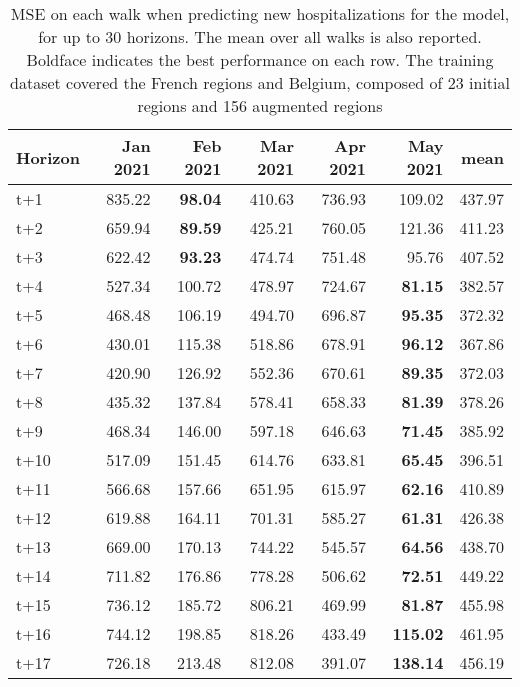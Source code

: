 \begin{table}[H]
\centering
\caption{MSE on each walk when predicting new hospitalizations for the model, for up to 30 horizons. The mean over all walks is also reported. Boldface indicates the best performance on each row. The training dataset covered the French regions and Belgium, composed of 23 initial regions and 156 augmented regions }
\label{tab:MSE_walk_encoder_decoder}
\begin{tabular}{lrrrrrr}
\toprule
Horizon &  Jan 2021 &  Feb 2021 &  Mar 2021 &  Apr 2021 &  May 2021 &   mean \\
\midrule
t+1  & 835.22  & \textbf{98.04}  & 410.63  & 736.93  & 109.02  & 437.97  \\
t+2  & 659.94  & \textbf{89.59}  & 425.21  & 760.05  & 121.36  & 411.23  \\
t+3  & 622.42  & \textbf{93.23}  & 474.74  & 751.48  & 95.76  & 407.52  \\
t+4  & 527.34  & 100.72  & 478.97  & 724.67  & \textbf{81.15}  & 382.57  \\
t+5  & 468.48  & 106.19  & 494.70  & 696.87  & \textbf{95.35}  & 372.32  \\
t+6  & 430.01  & 115.38  & 518.86  & 678.91  & \textbf{96.12}  & 367.86  \\
t+7  & 420.90  & 126.92  & 552.36  & 670.61  & \textbf{89.35}  & 372.03  \\
t+8  & 435.32  & 137.84  & 578.41  & 658.33  & \textbf{81.39}  & 378.26  \\
t+9  & 468.34  & 146.00  & 597.18  & 646.63  & \textbf{71.45}  & 385.92  \\
t+10  & 517.09  & 151.45  & 614.76  & 633.81  & \textbf{65.45}  & 396.51  \\
t+11  & 566.68  & 157.66  & 651.95  & 615.97  & \textbf{62.16}  & 410.89  \\
t+12  & 619.88  & 164.11  & 701.31  & 585.27  & \textbf{61.31}  & 426.38  \\
t+13  & 669.00  & 170.13  & 744.22  & 545.57  & \textbf{64.56}  & 438.70  \\
t+14  & 711.82  & 176.86  & 778.28  & 506.62  & \textbf{72.51}  & 449.22  \\
t+15  & 736.12  & 185.72  & 806.21  & 469.99  & \textbf{81.87}  & 455.98  \\
t+16  & 744.12  & 198.85  & 818.26  & 433.49  & \textbf{115.02}  & 461.95  \\
t+17  & 726.18  & 213.48  & 812.08  & 391.07  & \textbf{138.14}  & 456.19  \\

\end{tabular}
\end{table}

